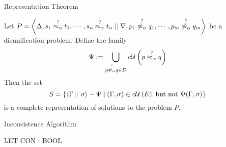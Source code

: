 \documentclass{beamer}
\begin{document}


    \begin{frame}{Representation Theorem}
        \begin{theorem}
            Let $P = \left\langle \Delta, s_1 \overset{?}{\mathrel{\approx_\alpha}} t_1, \cdots, s_n \overset{?}{\mathrel{\approx_\alpha}} t_n \mid\mid \nabla, p_1 \overset{?}{\mathrel{\not\approx_\alpha}} q_1, \cdots, p_m \overset{?}{\mathrel{\not\approx_\alpha}} q_m  \right\rangle$ be a disunification problem. Define the family
            $$\Psi := \bigcup\limits_{p \overset{?}{\mathrel{\not\approx_\alpha}} q \in D} c\mathcal{U}\left(p \overset{?}{\mathrel{\approx_\alpha}} q\right)$$
            Then the set $$S = \{ \left\langle \Gamma \mid\mid \sigma \right\rangle - \Psi \mid (\Gamma, \sigma) \in c\mathcal{U}\left(E\right) \text{ but not } \Psi (\Gamma, \sigma) \}$$
            is a complete representation of solutions to the problem $P$.
        \end{theorem}
    \end{frame}

    \begin{frame}{Inconsistence Algorithm}
        \begin{algorithm}[H]

            LET CON : BOOL \;
            \caption{Inconsistence Algorithm}
        \end{algorithm}
    \end{frame}
\end{document}
